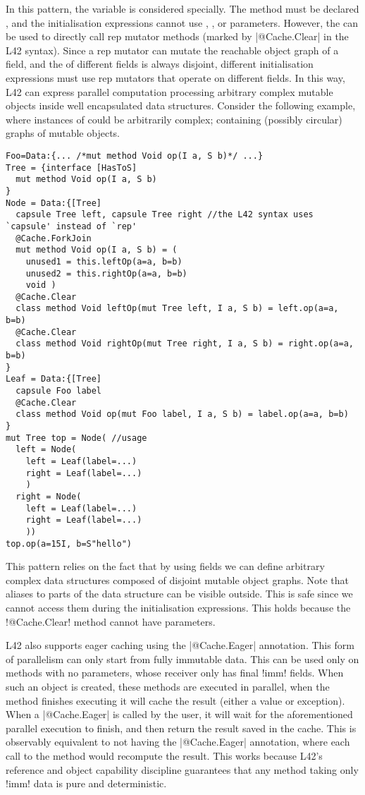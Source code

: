 In this pattern, the \Q@this@ variable is considered specially.
The method must be declared \Q@mut@, and the 
initialisation expressions cannot
use \Q@mut@, \Q@lent@, or \Q@read@ parameters.
However, the \Q@mut@ \Q@this@ can be used to directly call
rep mutator methods (marked by \Q|@Cache.Clear| in the L42 syntax).
Since a rep mutator can mutate the reachable object graph of a \Q@rep@ field, and the \mrog of different \Q@rep@ fields is always disjoint, 
different initialisation expressions must use rep mutators that operate on different \Q@rep@ fields.
In this way, L42 can express parallel computation processing arbitrary complex mutable objects inside well encapsulated data structures.
Consider the following example, where instances of \Q@Foo@ could be arbitrarily complex; containing (possibly circular) graphs of mutable objects.
\begin{lstlisting}[deletekeywords=label]
Foo=Data:{... /*mut method Void op(I a, S b)*/ ...}
Tree = {interface [HasToS]
  mut method Void op(I a, S b)
}
Node = Data:{[Tree] 
  capsule Tree left, capsule Tree right //the L42 syntax uses `capsule' instead of `rep'
  @Cache.ForkJoin
  mut method Void op(I a, S b) = (
    unused1 = this.leftOp(a=a, b=b)
    unused2 = this.rightOp(a=a, b=b)
    void )
  @Cache.Clear
  class method Void leftOp(mut Tree left, I a, S b) = left.op(a=a, b=b)
  @Cache.Clear
  class method Void rightOp(mut Tree right, I a, S b) = right.op(a=a, b=b) 
}
Leaf = Data:{[Tree]
  capsule Foo label
  @Cache.Clear
  class method Void op(mut Foo label, I a, S b) = label.op(a=a, b=b) 
}
mut Tree top = Node( //usage
  left = Node(
    left = Leaf(label=...)
    right = Leaf(label=...)
    )
  right = Node(
    left = Leaf(label=...)
    right = Leaf(label=...)
    ))
top.op(a=15I, b=S"hello")
\end{lstlisting}

This pattern relies on the fact that by using \Q@rep@ fields we can define arbitrary complex data structures composed of disjoint mutable object graphs.
Note that \Q@read@ aliases to parts of the data structure can be visible outside.
This is safe since we cannot access them during the initialisation expressions. This holds because the \Q!@Cache.Clear! method cannot have \Q@read@ parameters. %

L42 also supports eager caching using the \Q|@Cache.Eager| annotation.
This form of parallelism can only start from fully immutable data.
This can be used only on methods with no parameters,
whose receiver only has final \Q!imm! fields.
When such an object is created, these methods are executed in parallel, when the method finishes executing it will cache the result (either a value or exception).
When a \Q|@Cache.Eager| is called by the user, it will wait for the aforementioned parallel execution to finish, and then return the result saved in the cache.
This is observably equivalent to not having the \Q|@Cache.Eager| annotation, where each call to the method would recompute the result.
This works because L42's reference and object capability discipline guarantees that any method taking only \Q!imm! data is pure and deterministic.

